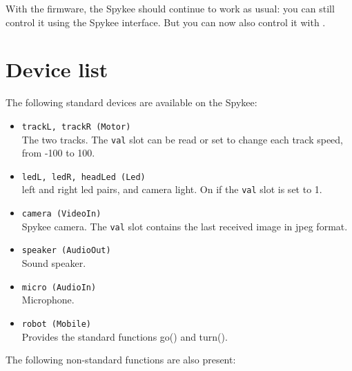 With the \urbi firmware, the Spykee should continue to work as usual: you
can still control it using the Spykee interface. But you can now also
control it with \urbi.


\section{Device list}

The following standard devices are available on the Spykee:

\begin{itemize}
\item \lstinline|trackL, trackR (Motor)| \\
  The two tracks. The \lstinline|val| slot can be read or set to change each
  track speed, from -100 to 100.
\item \lstinline|ledL, ledR, headLed (Led)| \\
  left and right led pairs, and camera light. On if the \lstinline|val| slot
  is set to 1.
\item \lstinline|camera (VideoIn)| \\
  Spykee camera. The \lstinline|val| slot contains the last received image
  in jpeg format.
\item \lstinline|speaker (AudioOut)| \\
  Sound speaker.
\item \lstinline|micro (AudioIn)| \\
  Microphone.
\item \lstinline|robot (Mobile)| \\
  Provides the standard functions go() and turn().
\end{itemize}

The following non-standard functions are also present:

